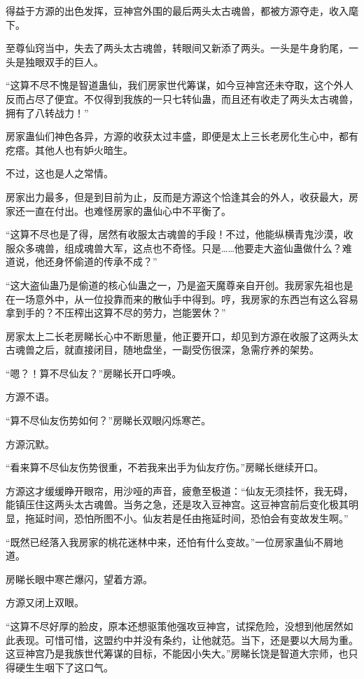 
\begin{this_body}

得益于方源的出色发挥，豆神宫外围的最后两头太古魂兽，都被方源夺走，收入麾下。

至尊仙窍当中，失去了两头太古魂兽，转眼间又新添了两头。一头是牛身豹尾，一头是独眼双手的巨人。

“这算不尽不愧是智道蛊仙，我们房家世代筹谋，如今豆神宫还未夺取，这个外人反而占尽了便宜。不仅得到我族的一只七转仙蛊，而且还有收走了两头太古魂兽，拥有了八转战力！”

房家蛊仙们神色各异，方源的收获太过丰盛，即便是太上三长老房化生心中，都有疙瘩。其他人也有妒火暗生。

不过，这也是人之常情。

房家出力最多，但是到目前为止，反而是方源这个恰逢其会的外人，收获最大，房家还一直在付出。也难怪房家的蛊仙心中不平衡了。

“这算不尽也是了得，居然有收服太古魂兽的手段！不过，他能纵横青鬼沙漠，收服众多魂兽，组成魂兽大军，这点也不奇怪。只是……他要走大盗仙蛊做什么？难道说，他还身怀偷道的传承不成？”

“这大盗仙蛊乃是偷道的核心仙蛊之一，乃是盗天魔尊亲自开创。我房家先祖也是在一场意外中，从一位投靠而来的散仙手中得到。哼，我房家的东西岂有这么容易拿到手的？不压榨出这算不尽的劳力，岂能罢休？”

房家太上二长老房睇长心中不断思量，他正要开口，却见到方源在收服了这两头太古魂兽之后，就直接闭目，随地盘坐，一副受伤很深，急需疗养的架势。

“嗯？！算不尽仙友？”房睇长开口呼唤。

方源不语。

“算不尽仙友伤势如何？”房睇长双眼闪烁寒芒。

方源沉默。

“看来算不尽仙友伤势很重，不若我来出手为仙友疗伤。”房睇长继续开口。

方源这才缓缓睁开眼帘，用沙哑的声音，疲惫至极道：“仙友无须挂怀，我无碍，能镇压住这两头太古魂兽。当务之急，还是攻入豆神宫。这豆神宫前后变化极其明显，拖延时间，恐怕所图不小。仙友若是任由拖延时间，恐怕会有变故发生啊。”

“既然已经落入我房家的桃花迷林中来，还怕有什么变故。”一位房家蛊仙不屑地道。

房睇长眼中寒芒爆闪，望着方源。

方源又闭上双眼。

“这算不尽好厚的脸皮，原本还想驱策他强攻豆神宫，试探危险，没想到他居然如此表现。可惜可惜，这盟约中并没有条约，让他就范。当下，还是要以大局为重。这豆神宫乃是我族世代筹谋的目标，不能因小失大。”房睇长饶是智道大宗师，也只得硬生生咽下了这口气。


\end{this_body}
